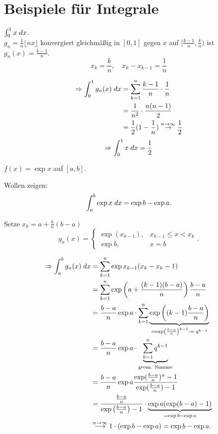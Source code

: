 \documentclass[../ana2u.tex]{subfiles}
\begin{document}
\setcounter{section}{1}

\section{Beispiele für Integrale}
\begin{bsp}
    \( \integral{x}{0}{1} \).\\
    \( g_n = \frac{1}{n} \lfloor nx \rfloor \) 
    konvergiert gleichmäßig in \( [0,1] \)
    gegen \(x\) auf \( [\frac{ k-1 }{n}, \frac{k}{n}) \)
    ist \( g_n(x) = \frac{k-1}{n} \).
    \[ x_k = \frac{k}{n},
    \quad x_k - x_{k-1} = \frac{1}{n} \]

    \begin{align*}
        \Rightarrow \integral{g_n(x)}{0}{1}
        &= \sum_{k=1}^n \frac{k-1}{n} \cdot \frac{1}{n}\\
        &= \frac{1}{n^2} \cdot \frac{n(n-1)}{2} \\
        &= \frac{1}{2} (1-\frac{1}{n}) 
        \overset{n\rightarrow \infty}{\rightarrow} 
        \frac{1}{2}
    \end{align*}
    \[ \Rightarrow \integral{x}{0}{1} = \frac{1}{2} \]
\end{bsp}
\begin{bsp}
    \begin{beh}
        \( f(x) = \exp x \) auf \( [a,b] \).
    \end{beh}    
    Wollen zeigen:
    \[ \integral{\exp x}{a}{b} = \exp b - \exp a. \]
    \begin{bew}
        Setze \( x_k = a + \frac{k}{n} (b-a) \)
        \[ g_n(x) = \begin{cases}
            \exp(x_{k-1}), &x_{k-1} \leq x < x_k\\
            \exp b, &x = b
        \end{cases}. \]
        
        \begin{align*}
            \Rightarrow \integral{g_n(x)}{a}{b} 
            &= \sum_{k=1}^n \exp x_{k-1}(x_k-x_k-1)\\
            &= \sum_{k=1}^n 
            \exp\left(a + \frac{(k-1)(b-a)}{n}\right)
            \frac{b-a}{n}\\
            &= \frac{b-a}{n} \exp a \cdot 
            \sum_{k=1}^n \underbrace{\exp \left( (k-1) \frac{b-a}{n} \right)}_
            {= \exp \left( \frac{b-a}{n} \right)^{k-1} := \;q^{k-1}}\\
            &= \frac{b-a}{n} \exp a \cdot 
            \underbrace{\sum_{k=1}^n q^{k-1} }_{\text{geom. Summe}}\\
            &= \frac{ b-a }{n} \exp a 
            \frac{ \exp(\frac{b-a}{n})^n - 1}{ \exp(\frac{b-a}{n}) - 1 }\\
            &= \frac{\frac{b-a}{n}}{\exp \left( \frac{b-a}{n} \right) - 1}
            \cdot \underbrace{\exp a (\exp(b-a) - 1)}_{=\exp b - \exp a}\\
            &\overset{n \rightarrow \infty}{\longrightarrow} 
            1 \cdot (\exp b - \exp a) = \exp b - \exp a.
        \end{align*}
    \end{bew}
\end{bsp}
\end{document}
